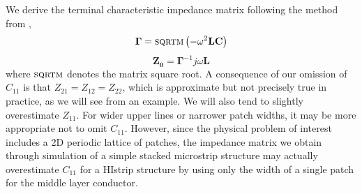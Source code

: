 \documentclass{allertonproc}
\begin{document}
We derive the terminal characteristic impedance matrix following the method from \cite{fariabook},
\begin{equation}
\mathbf{\Gamma} = \textsc{sqrtm}\left(-\omega^2\mathbf{L}\mathbf{C}\right)
\end{equation}
\begin{equation}
\mathbf{Z_0} = \mathbf{\Gamma}^{-1}j\omega\mathbf{L}
\end{equation}
where $\textsc{sqrtm}$ denotes the matrix square root.  A consequence of our omission of $C_{11}$ is that $Z_{21} = Z_{12} = Z_{22}$, which is approximate but not precisely true in practice, as we will see from an example.  We will also tend to slightly overestimate $Z_{11}$.  For wider upper lines or narrower patch widths, it may be more appropriate not to omit $C_{11}$.  However, since the physical problem of interest includes a 2D periodic lattice of patches, the impedance matrix we obtain through simulation of a simple stacked microstrip structure may actually overestimate $C_{11}$ for a HIstrip structure by using only the width of a single patch for the middle layer conductor.
\end{document}
